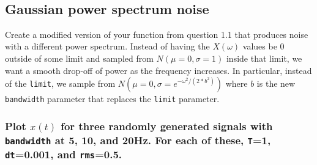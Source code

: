 \documentclass{article}
\begin{document}
    \begin{center}
    \end{center}
    { \hspace*{\fill} \\}
    
\subsection{Gaussian power spectrum noise}

Create a modified version of your function from question 1.1 that
produces noise with a different power spectrum. Instead of having the
$X(\omega)$ values be 0 outside of some limit and sampled from
$N(\mu=0,\sigma=1)$ inside that limit, we want a smooth drop-off of
power as the frequency increases. In particular, instead of the
\texttt{limit}, we sample from $N(\mu=0,\sigma=e^{-{\omega^2/(2*b^2)}})$
where $b$ is the new \texttt{bandwidth} parameter that replaces the
\texttt{limit} parameter.

\subsubsection{Plot $x(t)$ for three randomly generated signals with
\texttt{bandwidth} at 5, 10, and 20Hz. For each of these, \texttt{T}=1,
\texttt{dt}=0.001, and
\texttt{rms}=0.5.}\label{a-plot-xt-for-three-randomly-generated-signals-with-bandwidth-at-5-10-and-20hz.-for-each-of-these-t1-dt0.001-and-rms0.5.}
\end{document}
